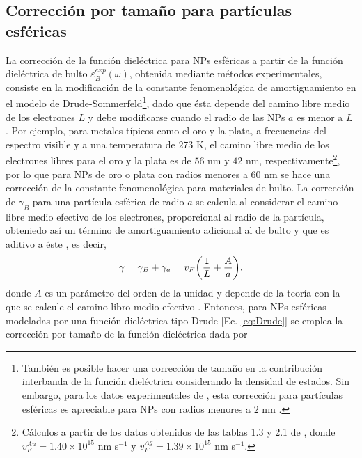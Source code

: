 \subsection{Corrección por tamaño para partículas esféricas}

La corrección de la función dieléctrica para NPs esféricas a partir de la función dieléctrica de bulto $\varepsilon_B^{exp}(\omega)$, obtenida mediante métodos experimentales, consiste en la modificación de la constante fenomenológica de amortiguamiento en el modelo de Drude-Sommerfeld\footnote{También es posible hacer una corrección de tamaño en la contribución interbanda de la función dieléctrica considerando la densidad de estados. Sin embargo, para los datos experimentales de \cite{johnson1972constants}, esta corrección para partículas esféricas es apreciable para NPs con radios menores a $2$ nm \cite{mendoza2014determination}.}, dado que ésta depende del camino libre medio de los electrones $L$ y debe modificarse cuando el radio de las NPs $a$ es menor a $L$ \cite{kreibig1995clusters}. Por ejemplo, para metales típicos  como el oro y la plata, a frecuencias del espectro visible y a una temperatura de $273$ K, el camino libre medio de los electrones libres para el oro y la plata es  de $56$ nm  y $42$ nm, respectivamente\footnote{Cálculos a partir de los datos obtenidos de las tablas 1.3 y 2.1 de \cite{ashcroft1976solid}, donde $v_F^{Au} = 1.40\times 10^{15}$ nm s$^{-1}$ y $v_F^{Ag}=1.39\times 10^{15}$ nm s$^{-1}$.}, por lo que para NPs de oro o plata con radios menores a $60$ nm se hace una corrección de la constante fenomenológica para materiales de bulto. La corrección de $\gamma_B $ para una partícula esférica de radio $a$ se calcula al considerar el camino libre medio efectivo de los electrones, proporcional al radio de la partícula, obteniedo así un término de amortiguamiento adicional al de bulto y que es aditivo a éste \cite{kreibig1995clusters}, es decir,
%
	\begin{align*}
	 \gamma = \gamma_B+ \gamma_a = v_F \qty(\frac{1}{L}+\frac{A}{a}). 
	\end{align*}
%
donde $A$ es un parámetro del orden de la unidad \cite{noguez2007surface,mendoza2014determination} y depende de la teoría con la que se calcule el camino libro medio efectivo \cite{kreibig1995clusters}.  Entonces, para NPs esféricas modeladas por una función dieléctrica tipo Drude [Ec.  \eqref{eq:Drude}] se emplea  la corrección por tamaño de la función dieléctrica dada por 
